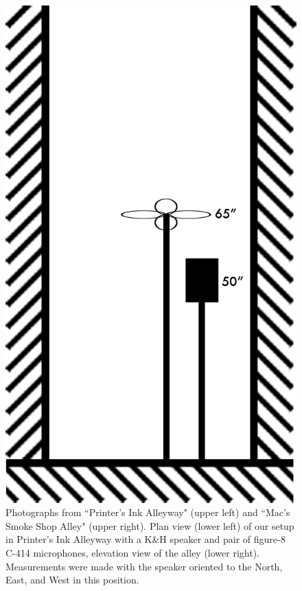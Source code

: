 \documentclass{aes137}
\begin{document}
\begin{figure}
\begin{minipage}[b]{0.41\linewidth}
\includegraphics[width=\textwidth]{images/alleyway_lookingdown.png}
\end{minipage}

\caption{Photographs from ``Printer's Ink Alleyway" (upper left) and ``Mac's Smoke Shop Alley" (upper right). Plan view (lower left) of our setup in Printer's Ink Alleyway
  with a K\&H speaker and pair of figure-8 C-414 microphones,
  elevation view of the alley (lower right). Measurements were made with the
  speaker oriented to the North, East, and West in this position.}
\end{figure}
\end{document}
